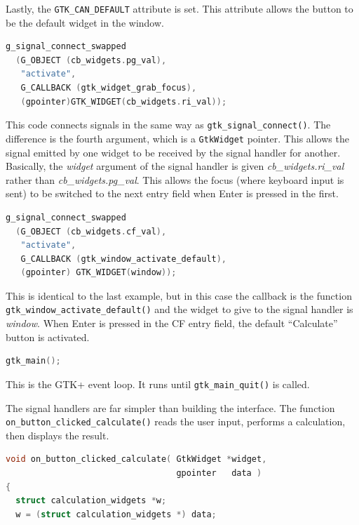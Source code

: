 \documentclass[a4paper,oneside]{article}
\newcommand{\variable}[1]{\textsl{#1}}
\newcommand{\class}[1]{\texttt{#1}}
\newcommand{\function}[1]{\texttt{#1()}}
\newcommand{\code}[1]{\texttt{#1}}
\begin{document}
Lastly, the \code{GTK\_CAN\_DEFAULT} attribute is set.  This attribute
allows the button to be the default widget in the window.

\begin{lstlisting}[numbers=none, language=C]
g_signal_connect_swapped
  (G_OBJECT (cb_widgets.pg_val),
   "activate",
   G_CALLBACK (gtk_widget_grab_focus),
   (gpointer)GTK_WIDGET(cb_widgets.ri_val));
\end{lstlisting}

This code connects signals in the same way as
\function{gtk\_signal\_connect}.  The difference is the fourth
argument, which is a \class{GtkWidget} pointer.  This allows the
signal emitted by one widget to be received by the signal handler for
another.  Basically, the \variable{widget} argument of the signal
handler is given \variable{cb\_widgets.ri\_val} rather than
\variable{cb\_widgets.pg\_val}.  This allows the focus (where keyboard
input is sent) to be switched to the next entry field when Enter is
pressed in the first.

\begin{lstlisting}[numbers=none, language=C]
g_signal_connect_swapped
  (G_OBJECT (cb_widgets.cf_val),
   "activate",
   G_CALLBACK (gtk_window_activate_default),
   (gpointer) GTK_WIDGET(window));
\end{lstlisting}

This is identical to the last example, but in this case the callback
is the function \function{gtk\_window\_activate\_default} and the widget
to give to the signal handler is \variable{window}.  When Enter is
pressed in the CF entry field, the default ``Calculate'' button is
activated.

\begin{lstlisting}[numbers=none, language=C]
gtk_main();
\end{lstlisting}

This is the GTK+ event loop.  It runs until \function{gtk\_main\_quit}
is called.

The signal handlers are far simpler than building the interface.  The
function \function{on\_button\_clicked\_calculate} reads the user
input, performs a calculation, then displays the result.

\begin{lstlisting}[numbers=none, language=C]
void on_button_clicked_calculate( GtkWidget *widget,
                                  gpointer   data )
{
  struct calculation_widgets *w;
  w = (struct calculation_widgets *) data;
\end{lstlisting}
\end{document}
